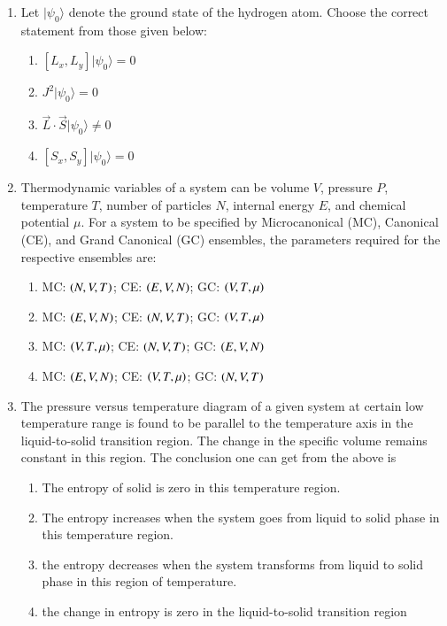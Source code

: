 \documentclass[journal,9pt,onecolumn]{IEEEtran}
\begin{document}
\begin{enumerate}
\begin{multicols}{2}
\begin{enumerate}
\end{enumerate}
\end{multicols}


\item Let $|\psi_0\rangle$ denote the ground state of the hydrogen atom. Choose the correct statement from those given below:
 
\begin{multicols}{2}
\begin{enumerate}
        \item $[L_x, L_y]|\psi_0\rangle = 0$
        \item $J^2 |\psi_0\rangle = 0$
        \item $\overrightarrow{L} \cdot \overrightarrow{S} |\psi_0\rangle \neq 0$
        \item $[S_x, S_y] |\psi_0\rangle = 0$
\end{enumerate}
\end{multicols}

\item Thermodynamic variables of a system can be volume $V$, pressure $P$, temperature $T$, number of particles $N$, internal energy $E$, and chemical potential $\mu$. For a system to be specified by Microcanonical (MC), Canonical (CE), and Grand Canonical (GC) ensembles, the parameters required for the respective ensembles are:
\begin{multicols}{2}
\begin{enumerate}
    \item MC: $\left(N, V, T\right)$; CE: $\left(E, V, N\right)$; GC: $\left(V, T, \mu\right)$
    \item MC: $\left(E, V, N\right)$; CE: $\left(N, V, T\right)$; GC: $\left(V, T, \mu\right)$
    \item MC: $\left(V, T, \mu\right)$; CE: $\left(N, V, T\right)$; GC: $\left(E, V, N\right)$
    \item MC: $\left(E, V, N\right)$; CE: $\left(V, T, \mu\right)$; GC: $\left(N, V, T\right)$
\end{enumerate}
\end{multicols}


\item The pressure versus temperature diagram of a given system at certain low temperature range is found to be parallel to the temperature axis in the liquid-to-solid transition region. The change in the specific volume remains constant in this region. The conclusion one can get from the above is
\begin{enumerate}
    \item The entropy of solid is zero in this temperature region.
    \item The entropy increases when the system goes from liquid to solid phase in this temperature region.
    \item  the entropy decreases when the system transforms from liquid to solid phase in this region of temperature.
    \item the change in entropy is zero in the liquid-to-solid transition region
\end{enumerate}


\end{enumerate}
\end{document}

